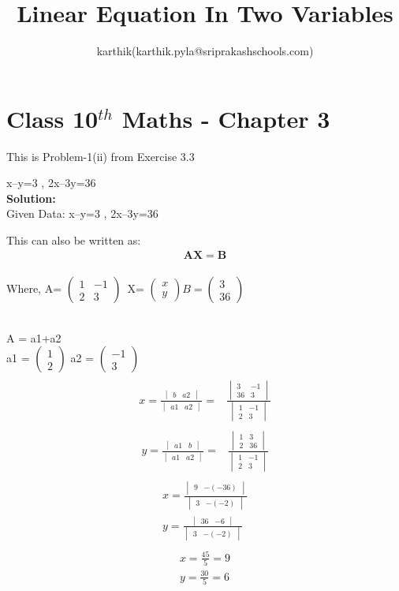 \documentclass[12pt]{article}
\title{Linear Equation In Two Variables}
\author{karthik(karthik.pyla@sriprakashschools.com)}
\newcommand{\myvec}[1]{\ensuremath{\begin{pmatrix}#1\end{pmatrix}}}
\newcommand{\mydet}[1]{\ensuremath{\begin{vmatrix}#1\end{vmatrix}}}
\newcommand{\solution}{\noindent \textbf{Solution: }}
\let\vec\mathbf
\begin{document}
\maketitle
\section*{Class 10$^{th}$ Maths - Chapter 3}
This is Problem-1(ii) from Exercise 3.3
\item  x–y=3 , 2x–3y=36 \\

\solution \\
Given Data: x–y=3 , 2x–3y=36

This can also be written as:
\begin{align}
\vec{A}\vec{X}=\vec{B}
\end{align}\\ Where, A= $\myvec{1&-1\\2&3}$\ X= $\myvec{x\\y} B= $\myvec{3\\36}

    \\A = a1+a2
    \\a1 = \myvec{1\\2} a2 = \myvec{-1\\3}
\begin{align}
\\x = \frac{\mydet{ b & a2}}{\mydet{ a1 & a2}} =&
\frac{\mydet{ 3 & -1\\ 36 & 3}}{\mydet{1&-1\\2&3}}
\end{align}
\begin{align}
\\y = \frac{\mydet{ a1 & b}}{\mydet{ a1 & a2}} =&
\frac{\mydet{ 1 & 3 \\ 2 & 36}}{\mydet{1&-1\\2&3}}
\end{align}
\begin{align}
  \\x = \frac{\mydet{ 9 &-(-36) }}{\mydet{ 3&-(-2) }} 
  \\y =   \frac{\mydet{ 36 & -6}}{\mydet{ 3 & -(-2)}} 
\end{align}
\begin{align}
\\ x = \frac{45}{5}=9
\\ y = \frac{30}{5}=6
\end{align}
\end{document}
